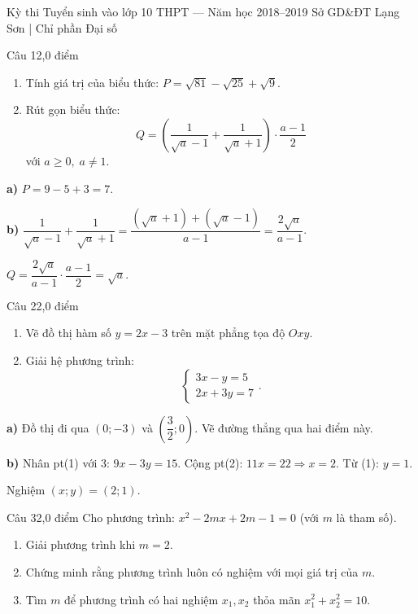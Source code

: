 ﻿%
%
  {Kỳ thi Tuyển sinh vào lớp 10 THPT — Năm học 2018--2019}%
  {Sở GD\&ĐT Lạng Sơn | Chỉ phần Đại số}

\begin{de_cau}{Câu 1}{2,0 điểm}
\begin{enumerate}[label=\alph*)]
  \item Tính giá trị của biểu thức: $P = \sqrt{81} - \sqrt{25} + \sqrt{9}$.
  \item Rút gọn biểu thức:
  \[Q = \left(\dfrac{1}{\sqrt{a}-1}+\dfrac{1}{\sqrt{a}+1}\right)\cdot\dfrac{a-1}{2}\]
  với $a \ge 0,\; a \neq 1$.
\end{enumerate}
\end{de_cau}

\begin{loi_giai_cau}
\textbf{a)} $P=9-5+3=\boxed{7}$.

\textbf{b)} $\dfrac{1}{\sqrt{a}-1}+\dfrac{1}{\sqrt{a}+1}=\dfrac{(\sqrt{a}+1)+(\sqrt{a}-1)}{a-1}=\dfrac{2\sqrt{a}}{a-1}$.

$Q=\dfrac{2\sqrt{a}}{a-1}\cdot\dfrac{a-1}{2}=\boxed{\sqrt{a}}$.
\end{loi_giai_cau}

\begin{de_cau}{Câu 2}{2,0 điểm}
\begin{enumerate}[label=\alph*)]
  \item Vẽ đồ thị hàm số $y = 2x - 3$ trên mặt phẳng tọa độ $Oxy$.
  \item Giải hệ phương trình:
  \[\begin{cases} 3x-y=5 \\ 2x+3y=7 \end{cases}.\]
\end{enumerate}
\end{de_cau}

\begin{loi_giai_cau}
\textbf{a)} Đồ thị đi qua $(0;-3)$ và $\left(\dfrac{3}{2};0\right)$. Vẽ đường thẳng qua hai điểm này.

\textbf{b)} Nhân pt(1) với 3: $9x-3y=15$. Cộng pt(2): $11x=22\Rightarrow x=2$. Từ (1): $y=1$.

Nghiệm $\boxed{(x;y)=(2;1)}$.
\end{loi_giai_cau}

\begin{de_cau}{Câu 3}{2,0 điểm}
Cho phương trình: $x^2 - 2mx + 2m - 1 = 0$ (với $m$ là tham số).
\begin{enumerate}[label=\alph*)]
  \item Giải phương trình khi $m = 2$.
  \item Chứng minh rằng phương trình luôn có nghiệm với mọi giá trị của $m$.
  \item Tìm $m$ để phương trình có hai nghiệm $x_1, x_2$ thỏa mãn $x_1^2 + x_2^2 = 10$.
\end{enumerate}
\end{de_cau}

